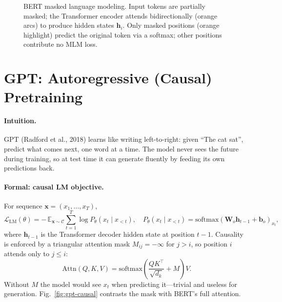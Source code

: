 \begin{figure}[h]
\caption{BERT masked language modeling. Input tokens are partially masked; the Transformer encoder attends bidirectionally (orange arcs) to produce hidden states $\mathbf{h}_i$. Only masked positions (orange highlight) predict the original token via a softmax; other positions contribute no MLM loss.}
\label{fig:bert-mask}
\end{figure}

\section{GPT: Autoregressive (Causal) Pretraining}
\label{sec:gpt}
\paragraph{Intuition.} GPT (Radford et al., 2018) learns like writing left-to-right: given ``The cat sat'', predict what comes next, one word at a time. The model never sees the future during training, so at test time it can generate fluently by feeding its own predictions back.

\paragraph{Formal: causal LM objective.} For sequence $\mathbf{x}=(x_1,\dots,x_T)$,
\begin{equation}
\mathcal{L}_{\text{LM}}(\theta)= -\,\mathbb{E}_{\mathbf{x}\sim\mathcal{C}}\sum_{t=1}^{T}\log P_\theta(x_t\mid x_{<t}),\quad
P_\theta(x_t\mid x_{<t})=\mathrm{softmax}(\mathbf{W}_o\mathbf{h}_{t-1}+\mathbf{b}_o)_{x_t},
\label{eq:gpt-lm}
\end{equation}
where $\mathbf{h}_{t-1}$ is the Transformer decoder hidden state at position $t-1$. Causality is enforced by a triangular attention mask $M_{ij}=-\infty$ for $j>i$, so position $i$ attends only to $j\le i$:
\begin{equation}
\mathrm{Attn}(Q,K,V)=\mathrm{softmax}\!\left(\frac{QK^\top}{\sqrt{d_k}}+M\right)V.
\label{eq:causal-mask}
\end{equation}
Without $M$ the model would see $x_t$ when predicting it---trivial and useless for generation. Fig.~\ref{fig:gpt-causal} contrasts the mask with BERT's full attention.

